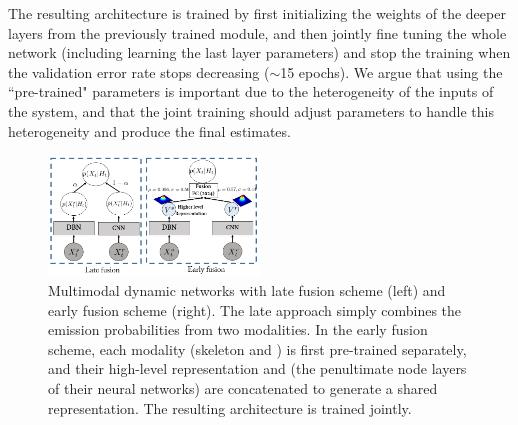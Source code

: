 The resulting architecture is trained by first initializing the weights of the deeper layers from the previously trained module,
and then jointly fine tuning the whole network (including learning the last layer parameters)
and stop the training when the validation error rate stops decreasing ($\sim$15 epochs).
%
We argue that using the ``pre-trained" parameters is important due to the heterogeneity of the inputs of the system,
and that the joint training should adjust parameters to handle  this heterogeneity and produce the final estimates.


\begin{figure}[t]
  \centering
  \includegraphics[width=0.5\textwidth]{images/Fusion_combined}
\vspace*{-2mm}
\caption{
Multimodal dynamic networks with late fusion scheme (left) and early fusion scheme (right).
The late approach simply combines the emission probabilities from two modalities.
In the early fusion scheme, each modality (skeleton and \RGBD) is first pre-trained separately,
and their high-level representation \highSK and \highRGBD (the penultimate node layers of their neural networks)
are concatenated to generate a shared representation. The resulting architecture is trained jointly.
  }\label{fig:fusion}
\end{figure}



\endinput
